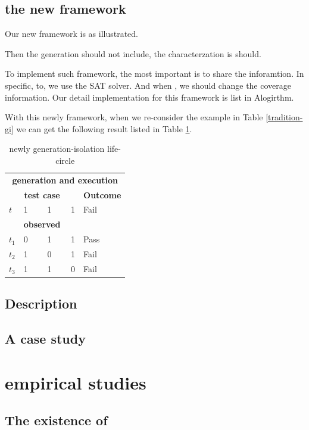\documentclass{sig-alternate}
\begin{document}
\subsection{the new framework}
Our new framework is as illustrated.  

Then the generation should not include, the characterzation is should.

To implement such framework, the most important is to share the inforamtion. In specific, to, we use the SAT solver. And when , we should change the coverage information. Our detail implementation for this framework is list in Alogirthm.

With this newly framework, when we re-consider the example in Table \ref{tradition-gi} we can get the following result listed in Table \ref{new-gi}.
\begin{table}[h]
\caption{newly generation-isolation life-circle}
\label{new-gi}
\center
\begin{tabular}{llllll}
\multicolumn{6}{c}{\bfseries generation and execution} \\
\multicolumn{5}{c}{\bfseries test case} & \bfseries Outcome \\
 $t$ & \multicolumn{4}{l}{1 \ \ \ \ 1 \ \ \ \  1 } & Fail \\
 \hline
\multicolumn{5}{c}{\bfseries observed} &  \\
$t_{1}$ &\multicolumn{4}{l}{0  \ \ \ \  1 \ \ \ \  1 }& Pass \\
$t_{2}$ &\multicolumn{4}{l}{1  \ \ \ \  0 \ \ \ \  1 } & Fail \\
$t_{3}$ &\multicolumn{4}{l}{1  \ \ \ \  1 \ \ \ \  0 } & Fail \\
\end{tabular}
\end{table}

\subsection{Description}


\subsection{A case study}

\section{empirical studies}


\subsection{The existence of }
\end{document}

